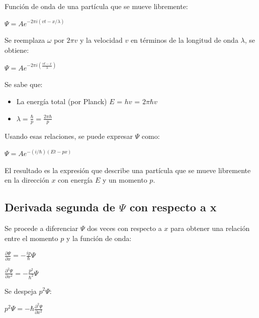 \documentclass[a4paper]{article}
\begin{document}
        Función de onda de una partícula que se mueve libremente:
        \begin{center}
            $\Psi = Ae^{-2 \pi i (vt-x/ \lambda)}$ 
        \end{center}

        Se reemplaza $\omega$ por $2 \pi v$ y la velocidad $v$ en términos de la longitud de onda $\lambda$, se obtiene:

        \begin{center}
            $\Psi = Ae^{-2 \pi i (\frac{vt - x}{\lambda})}$
        \end{center}

        Se sabe que:
        \begin{itemize}
            \item La energía total (por Planck) $E$ = $hv$ = $2\pi \hbar v$ 
            \item $\lambda = \frac{\hbar}{p} = \frac{2 \pi \hbar}{p}$
        \end{itemize}

        Usando esas relaciones, se puede expresar $\Psi$ como:

        \begin{center}
            $\Psi = Ae^{-(i/\hbar)(Et - px)}$
        \end{center}

        El resultado es la expresión que describe una partícula que se mueve libremente en la dirección $x$ con energía $E$ y un momento $p$.

        \subsection{Derivada segunda de $\Psi$ con respecto a x}
            \indent Se procede a diferenciar $\Psi$ dos veces con respecto a $x$ para obtener una relación entre el momento $p$ y la función de onda:

            \begin {center}
                $\frac{\partial \Psi}{\partial x} = - \frac{ip}{\hbar} \Psi$
            \end{center}

            \begin {center}
                $\frac{\partial ^2 \Psi}{\partial x^2} = - \frac{p^2}{\hbar ^2} \Psi$
            \end{center}

            Se despeja $p^2 \Psi$: 

            \begin{center}
                $p^2 \Psi = - \hbar \frac{\partial ^2 \Psi}{\partial x^2}$
            \end{center}
\end{document}
